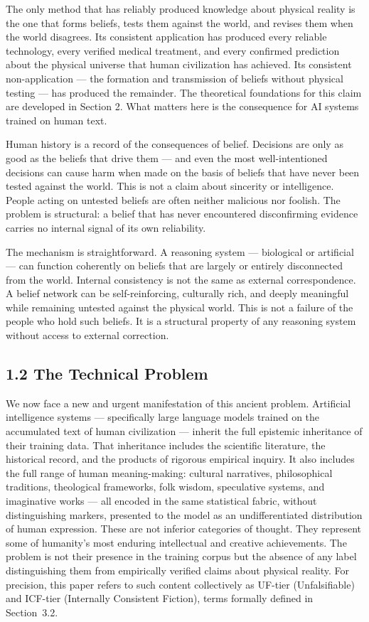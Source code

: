 \documentclass[
]{article}
\begin{document}
The only method that has reliably produced knowledge about physical
reality is the one that forms beliefs, tests them against the world, and
revises them when the world disagrees. Its consistent application has
produced every reliable technology, every verified medical treatment,
and every confirmed prediction about the physical universe that human
civilization has achieved. Its consistent non-application --- the
formation and transmission of beliefs without physical testing --- has
produced the remainder. The theoretical foundations for this claim are
developed in Section 2. What matters here is the consequence for AI
systems trained on human text.

Human history is a record of the consequences of belief. Decisions are
only as good as the beliefs that drive them --- and even the most
well-intentioned decisions can cause harm when made on the basis of
beliefs that have never been tested against the world. This is not a
claim about sincerity or intelligence. People acting on untested beliefs
are often neither malicious nor foolish. The problem is structural: a
belief that has never encountered disconfirming evidence carries no
internal signal of its own reliability.

The mechanism is straightforward. A reasoning system --- biological or
artificial --- can function coherently on beliefs that are largely or
entirely disconnected from the world. Internal consistency is not the
same as external correspondence. A belief network can be
self-reinforcing, culturally rich, and deeply meaningful while remaining
untested against the physical world. This is not a failure of the people
who hold such beliefs. It is a structural property of any reasoning
system without access to external correction.

\subsection{1.2 The Technical Problem}\label{the-technical-problem}

We now face a new and urgent manifestation of this ancient problem.
Artificial intelligence systems --- specifically large language models
trained on the accumulated text of human civilization --- inherit the
full epistemic inheritance of their training data. That inheritance
includes the scientific literature, the historical record, and the
products of rigorous empirical inquiry. It also includes the full range
of human meaning-making: cultural narratives, philosophical traditions,
theological frameworks, folk wisdom, speculative systems, and
imaginative works --- all encoded in the same statistical fabric,
without distinguishing markers, presented to the model as an
undifferentiated distribution of human expression. These are not
inferior categories of thought. They represent some of humanity's most
enduring intellectual and creative achievements. The problem is not
their presence in the training corpus but the absence of any label
distinguishing them from empirically verified claims about physical
reality. For precision, this paper refers to such content collectively
as UF-tier (Unfalsifiable) and ICF-tier (Internally Consistent Fiction),
terms formally defined in Section~3.2.
\end{document}
